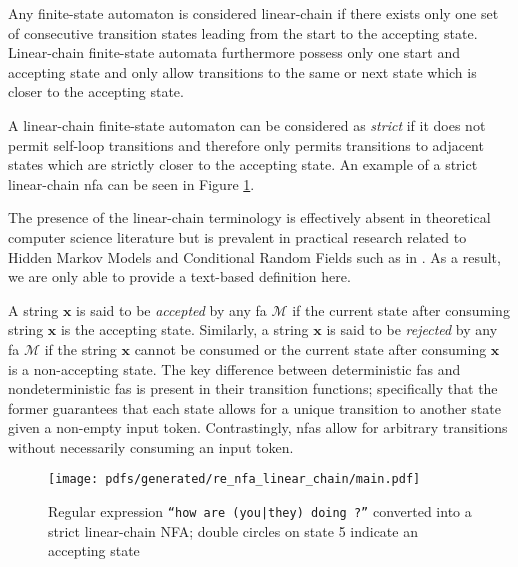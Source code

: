 \begin{definition}
  \label{def:lfa}
  Any finite-state automaton is considered linear-chain if there exists only one
  set of consecutive transition states leading from the start to the accepting
  state. Linear-chain finite-state automata furthermore possess only one start
  and accepting state and only allow transitions to the same or next state which is
  closer to the accepting state.

  \begin{remark}
    \label{rmk:strict_linear_chain}
    A linear-chain finite-state automaton can be considered as \textit{strict}
    if it does not permit self-loop transitions and therefore only permits
    transitions to adjacent states which are strictly closer to the
    accepting state. An example of a strict linear-chain \ac{nfa} can be seen in
    Figure \ref{fig:regex_fa}.
  \end{remark}

  \begin{remark}
    The presence of the linear-chain terminology is effectively absent in
    theoretical computer science literature but is prevalent in practical
    research related to Hidden Markov Models and Conditional Random
    Fields such as in \citet{tsuruoka2009fast}. As a result, we are only
    able to provide a text-based definition here.
  \end{remark}
  
\end{definition}

A string $\bm{x}$ is said to be \textit{accepted} by any \ac{fa} $\mathcal{M}$
if the current state after consuming string $\bm{x}$ is the accepting state.
Similarly, a string $\bm{x}$ is said to be \textit{rejected} by any \ac{fa}
$\mathcal{M}$ if the string $\bm{x}$ cannot be consumed or the current state
after consuming $\bm{x}$ is a non-accepting state. The key difference between
deterministic \ac{fas} and nondeterministic \ac{fas} is present in their
transition functions; specifically that the former guarantees that each state
allows for a unique transition to another state given a non-empty input token.
Contrastingly, \ac{nfas} allow for arbitrary transitions without necessarily
consuming an input token.

\begin{figure}[t]
  \centering
  \texttt{[image: pdfs/generated/re\_nfa\_linear\_chain/main.pdf]}
  \caption{Regular expression \texttt{``how are (you|they) doing ?''} converted
    into a strict linear-chain NFA; double circles on state 5 indicate an
    accepting state}
  \label{fig:regex_fa}
\end{figure}


